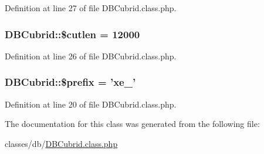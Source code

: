 Definition at line 27 of file D\-B\-Cubrid.\-class.\-php.

\hypertarget{classDBCubrid_a0f61a81aecf7cd9829d0fc390b2895a5}{
\subsubsection[{\$cutlen}]{\setlength{\rightskip}{0pt plus 5cm}D\-B\-Cubrid\-::\$cutlen = 12000}}\label{classDBCubrid_a0f61a81aecf7cd9829d0fc390b2895a5}


Definition at line 26 of file D\-B\-Cubrid.\-class.\-php.

\hypertarget{classDBCubrid_a78aa323ac3bf494cbc63d3a2ae05a6f5}{
\subsubsection[{\$prefix}]{\setlength{\rightskip}{0pt plus 5cm}D\-B\-Cubrid\-::\$prefix = 'xe\-\_\-'}}\label{classDBCubrid_a78aa323ac3bf494cbc63d3a2ae05a6f5}


Definition at line 20 of file D\-B\-Cubrid.\-class.\-php.



The documentation for this class was generated from the following file\-:\begin{DoxyCompactItemize}
\item 
classes/db/\hyperlink{DBCubrid_8class_8php}{D\-B\-Cubrid.\-class.\-php}\end{DoxyCompactItemize}
